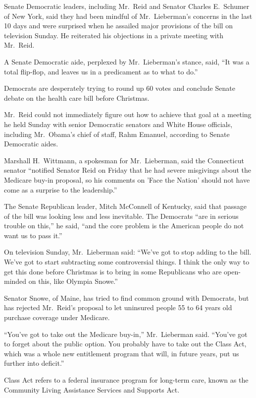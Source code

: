 ﻿\documentclass[12pt]{article}
\begin{document}
Senate Democratic leaders, including Mr.~Reid and Senator Charles E.~Schumer of New York, said they
had been mindful of Mr.~Lieberman's concerns in the last 10 days and were surprised when he assailed
major provisions of the bill on television Sunday. He reiterated his objections in a private meeting
with Mr.~Reid.

A Senate Democratic aide, perplexed by Mr.~Lieberman's stance, said, ``It was a total flip-flop, and
leaves us in a predicament as to what to do.''

Democrats are desperately trying to round up 60 votes and conclude Senate debate on the health care
bill before Christmas.

Mr.~Reid could not immediately figure out how to achieve that goal at a meeting he held Sunday with
senior Democratic senators and White House officials, including Mr.~Obama's chief of staff, Rahm
Emanuel, according to Senate Democratic aides.

Marshall H.~Wittmann, a spokesman for Mr.~Lieberman, said the Connecticut senator ``notified Senator
Reid on Friday that he had severe misgivings about the Medicare buy-in proposal, so his comments on
'Face the Nation' should not have come as a surprise to the leadership.''

The Senate Republican leader, Mitch McConnell of Kentucky, said that passage of the bill was looking
less and less inevitable. The Democrats ``are in serious trouble on this,'' he said, ``and the core
problem is the American people do not want us to pass it.''

On television Sunday, Mr.~Lieberman said: ``We've got to stop adding to the bill. We've got to start
subtracting some controversial things. I think the only way to get this done before Christmas is to
bring in some Republicans who are open-minded on this, like Olympia Snowe.''

Senator Snowe, of Maine, has tried to find common ground with Democrats, but has rejected Mr.~Reid's
proposal to let uninsured people 55 to 64 years old purchase coverage under Medicare.

``You've got to take out the Medicare buy-in,'' Mr.~Lieberman said. ``You've got to forget about the
public option. You probably have to take out the Class Act, which was a whole new entitlement
program that will, in future years, put us further into deficit.''

Class Act refers to a federal insurance program for long-term care, known as the Community Living
Assistance Services and Supports Act.
\end{document}
